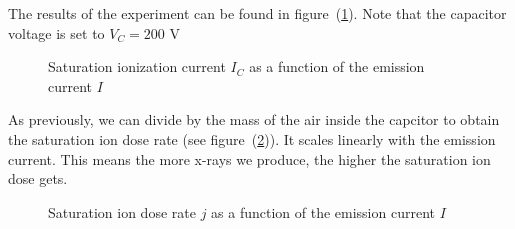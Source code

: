 \documentclass{scrartcl}
\begin{document}
\noindent The results of the experiment can be found in figure~(\ref{fig:SaturationIonizationCurrentAsFunctionOfEmissionCurrent}). Note that the capacitor voltage is set to $V_C = 200$ V



\begin{figure}[!ht]
    \centering
    \caption{Saturation ionization current $I_C$ as a function of the emission current $I$}
    \label{fig:SaturationIonizationCurrentAsFunctionOfEmissionCurrent}
\end{figure}
\FloatBarrier


\noindent As previously, we can divide by the mass of the air inside the capcitor to obtain the saturation ion dose rate (see figure~(\ref{fig:SaturationIonDoseRateAsFunctionOfEmissionCurrent})). It scales linearly with the emission current. This means the more x-rays we produce, the higher the saturation ion dose gets.

\begin{figure}[!ht]
    \centering
    \caption{Saturation ion dose rate $j$ as a function of the emission current $I$}
    \label{fig:SaturationIonDoseRateAsFunctionOfEmissionCurrent}
\end{figure}
\FloatBarrier
\end{document}

